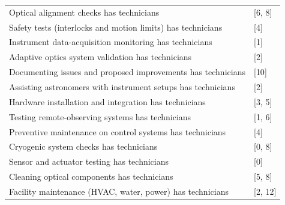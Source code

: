\documentclass{article}
\begin{document}
\begin{table}[!ht]
\begin{tabular}{ll}
Optical alignment checks has technicians                          & {[}6, 8{]}                               \\
Safety tests (interlocks and motion limits) has technicians       & {[}4{]}                                  \\
Instrument data-acquisition monitoring has technicians            & {[}1{]}                                  \\
Adaptive optics system validation has technicians                 & {[}2{]}                                  \\
Documenting issues and proposed improvements has technicians      & {[}10{]}                                 \\
Assisting astronomers with instrument setups has technicians      & {[}2{]}                                  \\
Hardware installation and integration has technicians             & {[}3, 5{]}                               \\
Testing remote‑observing systems has technicians                  & {[}1, 6{]}                               \\
Preventive maintenance on control systems has technicians         & {[}4{]}                                  \\
Cryogenic system checks has technicians                           & {[}0, 8{]}                               \\
Sensor and actuator testing has technicians                       & {[}0{]}                                  \\
Cleaning optical components has technicians                       & {[}5, 8{]}                               \\
Facility maintenance (HVAC, water, power) has technicians         & {[}2, 12{]}                             
\end{tabular}
\end{table}
\end{document}

